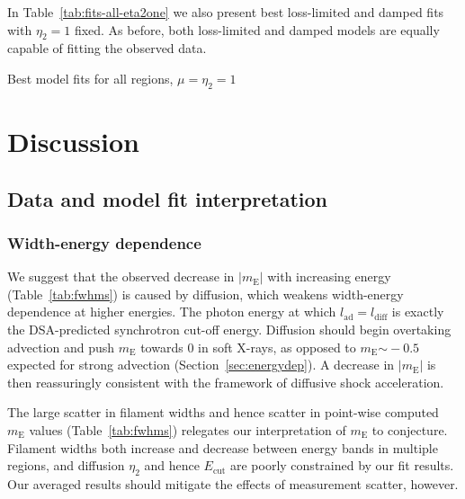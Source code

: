 \documentclass[manuscript]{aastex}  %
\newcommand*{\mt}{\mathrm}
\newcommand*{\abt}{\mathord{\sim}} %
\newcommand*{\mE}{m_\mt{E}}
\newcommand*{\Ecut}{E_{\mt{cut}}}
\begin{document}
In Table~\ref{tab:fits-all-eta2one} we also present best loss-limited and
damped fits with $\eta_2 = 1$ fixed.  As before, both loss-limited and damped
models are equally capable of fitting the observed data.

\begin{table}
    \scriptsize
    \centering
    \caption{Best model fits for all regions, $\mu = \eta_2 = 1$
    \label{tab:fits-all-eta2one}}
    
\end{table}


\section{Discussion}

\subsection{Data and model fit interpretation}

\subsubsection{Width-energy dependence}

We suggest that the observed decrease in $|\mE|$ with increasing energy
(Table~\ref{tab:fwhms}) is caused by diffusion, which weakens width-energy
dependence at higher energies.  The photon energy at which $l_{\mt{ad}} =
l_{\mt{diff}}$ is exactly the DSA-predicted synchrotron cut-off energy.
Diffusion should begin overtaking advection and push $\mE$ towards $0$ in soft
X-rays, as opposed to $\mE \abt -0.5$ expected for strong advection
(Section~\ref{sec:energydep}).  A decrease in $|\mE|$ is then reassuringly
consistent with the framework of diffusive shock acceleration.

The large scatter in filament widths and hence scatter in point-wise computed
$\mE$ values (Table~\ref{tab:fwhms}) relegates our interpretation of $\mE$ to
conjecture.  Filament widths both increase and decrease between energy bands in
multiple regions, and diffusion $\eta_2$ and hence $\Ecut$ are poorly
constrained by our fit results.  Our averaged results should mitigate the
effects of measurement scatter, however.
\end{document}
